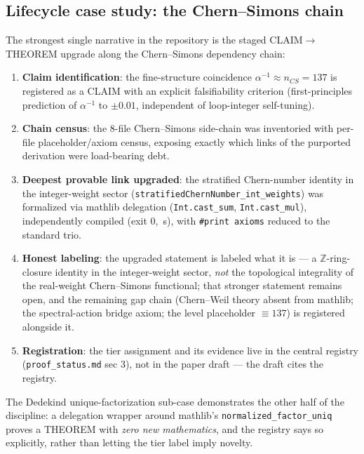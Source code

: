 \subsection{Lifecycle case study: the Chern--Simons chain}
\label{sec:cschain}
The strongest single narrative in the repository is the staged
CLAIM$\to$THEOREM upgrade along the Chern--Simons dependency chain:
\begin{enumerate}
\item \textbf{Claim identification}: the fine-structure coincidence
$\alpha^{-1}\!\approx\!n_{CS}\!=\!137$ is registered as a CLAIM with
an explicit falsifiability criterion (first-principles prediction of
$\alpha^{-1}$ to $\pm 0.01$, independent of loop-integer self-tuning).
\item \textbf{Chain census}: the 8-file Chern--Simons side-chain was
inventoried with per-file placeholder/axiom census, exposing exactly
which links of the purported derivation were load-bearing debt.
\item \textbf{Deepest provable link upgraded}: the stratified
Chern-number identity in the integer-weight sector
(\texttt{stratifiedChernNumber\_int\_weights}) was formalized via
mathlib delegation (\texttt{Int.cast\_sum}, \texttt{Int.cast\_mul}),
independently compiled (exit 0, \,s), with
\texttt{\#print axioms} reduced to the standard trio.
\item \textbf{Honest labeling}: the upgraded statement is labeled what
it is --- a $\mathbb{Z}$-ring-closure identity in the integer-weight
sector, \emph{not} the topological integrality of the real-weight
Chern--Simons functional; that stronger statement remains open, and
the remaining gap chain (Chern--Weil theory absent from mathlib; the
spectral-action bridge axiom; the level placeholder
$\equiv\!137$) is registered alongside it.
\item \textbf{Registration}: the tier assignment and its evidence
live in the central registry (\texttt{proof\_status.md} sec 3), not
in the paper draft --- the draft cites the registry.
\end{enumerate}
The Dedekind unique-factorization sub-case demonstrates the other
half of the discipline: a delegation wrapper around mathlib's
\texttt{normalized\_factor\_uniq} proves a THEOREM with \emph{zero
new mathematics}, and the registry says so explicitly, rather than
letting the tier label imply novelty.

